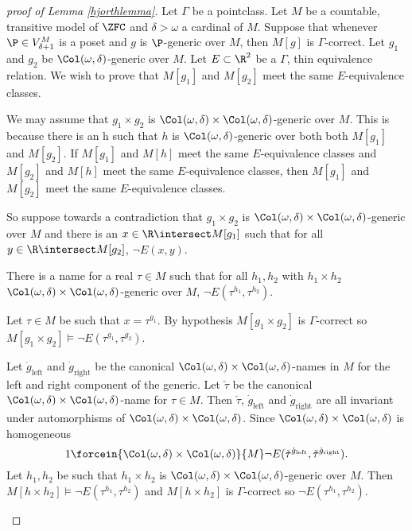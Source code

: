 \documentclass[oneside,12pt]{amsart}
\begin{document}
\begin{proof}[proof of Lemma \ref{hjorthlemma}]
Let $\Gamma$ be a pointclass.
Let $M$ be a countable, transitive model of $\ZFC$ and  $\delta>\omega$ a cardinal of $M$.
Suppose that whenever $\P\in V^M_{\delta+1}$ is a poset and $g$ is $\P$-generic over $M$, then
$M[g]$ is $\Gamma$-correct. Let $g_1$ and $g_2$ be $\Col(\omega, \delta)$-generic over $M$.
Let $E\subset\R^2$ be a $\Gamma$, thin equivalence relation.
We wish to prove that $M[g_1]$ and $M[g_2]$ meet the same $E$-equivalence classes.

We may assume that $g_1\times g_2$ is $\Col(\omega, \delta)\times \Col(\omega, \delta)$-generic over $M$.
This is because there is an h such that $h$ is $\Col(\omega, \delta)$-generic over both
both $M[g_1]$ and $M[g_2]$. If $M[g_1]$ and $M[h]$ meet the same $E$-equivalence classes and
$M[g_2]$ and $M[h]$ meet the same $E$-equivalence classes, then
$M[g_1]$ and $M[g_2]$ meet the same $E$-equivalence classes.

So suppose towards a contradiction that $g_1\times g_2$ is $\Col(\omega, \delta)\times \Col(\omega, \delta)$-generic over $M$
and there is an $x\in\R\intersect M[g_1]$ such that for all $y\in \R\intersect M[g_2]$, $\neg E(x,y)$.

\begin{claim}[Claim 1]
There is a name for a real $\tau\in M$ such that for all $h_1,h_2$
with $h_1\times h_2$ $\Col(\omega, \delta)\times \Col(\omega, \delta)$-generic over $M$,
$\neg E(\tau^{h_1},\tau^{h_2})$.
\end{claim}
\begin{subproof}
Let $\tau\in M$ be such that $x=\tau^{g_1}$. By hypothesis $M[g_1\times g_2]$ is $\Gamma$-correct
so $M[g_1\times g_2]\models \neg E(\tau^{g_1},\tau^{g_2})$.

Let $\dot{g}_{\text{left}}$ and $\dot{g}_{\text{right}}$
be the canonical $\Col(\omega, \delta)\times \Col(\omega, \delta)$-names in $M$ for the left and right component of the generic.
Let $\check{\tau}$ be the canonical $\Col(\omega, \delta)\times \Col(\omega, \delta)$-name for $\tau\in M$.
Then $\check{\tau}$, $\dot{g}_{\text{left}}$ and $\dot{g}_{\text{right}}$ are all invariant under automorphisms of $\Col(\omega, \delta)\times \Col(\omega, \delta)$.
Since $\Col(\omega, \delta)\times \Col(\omega, \delta)$ is homogeneous
$$1\forcein{\Col(\omega, \delta)\times \Col(\omega, \delta)}{M} \neg E(\check{\tau}^{\dot{g}_{\text{left}}},\check{\tau}^{\dot{g}_{\text{right}}}).$$
Let $h_1,h_2$ be such that $h_1\times h_2$ is $\Col(\omega, \delta)\times \Col(\omega, \delta)$-generic over $M$.
Then $M[h\times h_2]\models \neg E(\tau^{h_1},\tau^{h_2})$ and $M[h\times h_2]$ is $\Gamma$-correct so $\neg E(\tau^{h_1},\tau^{h_2})$.
\end{subproof}


\end{proof}
\end{document}
